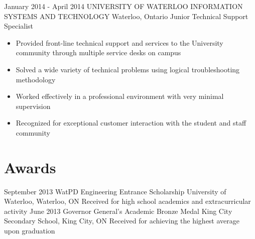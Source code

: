 \documentclass[hidelinks]{kkurucz-cv}
\begin{document}
\begin{entrylist}
\entry
{January 2014 - April 2014}
{UNIVERSITY OF WATERLOO INFORMATION SYSTEMS AND TECHNOLOGY}
{Waterloo, Ontario}
{Junior Technical Support Specialist}
{
\begin{itemize}
	\item Provided front-line technical support and services to the University community through multiple service desks on campus
	\item Solved a wide variety of technical problems using logical troubleshooting methodology
	\item Worked effectively in a professional environment with very minimal supervision
	\item Recognized for exceptional customer interaction with the student and staff community
\end{itemize}
}
\end{entrylist}

%


\section{Awards}

\begin{entrylist}
\entry
{September 2013}
{WatPD Engineering Entrance Scholarship}
{University of Waterloo, Waterloo, ON}
{Received for high school academics and extracurricular activity}
{\null}
\entry
{June 2013}
{Governor General's Academic Bronze Medal}
{King City Secondary School, King City, ON}
{Received for achieving the highest average upon graduation}
{\null}
\end{entrylist}
\end{document}
